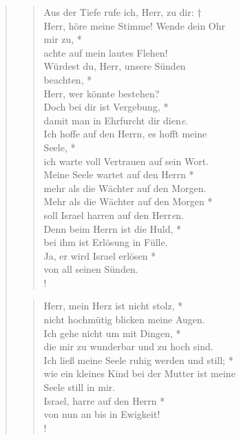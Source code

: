 \begin{quote}
\begin{verse}
Aus der Tiefe rufe ich, Herr, zu dir: †\\
Herr, höre meine Stimme! Wende dein Ohr \\mir zu, *\\ 
achte auf mein lautes Flehen! \\ \vin
Würdest du, Herr, unsere Sünden\\ \vin beachten, *\\ \vin 
Herr, wer könnte bestehen? \\
Doch bei dir ist Vergebung, *\\ 
damit man in Ehrfurcht dir dien\textit{e}.\\ \vin  
Ich hoffe auf den Herrn, es hofft meine \\ \vin Seele, *\\ \vin 
ich warte voll Vertrauen auf sein Wort.\\  
Meine Seele wartet auf den Herrn *\\ 
mehr als die Wächter auf den Morgen.\\ \vin 
 Mehr als die Wächter auf den Morgen *\\ \vin  
soll Israel harren auf den Herr\textit{e}n.\\  
Denn beim Herrn ist die Huld, *\\ 
bei ihm ist Erlösung in Fülle.\\ \vin  
Ja, er wird Israel erlösen *\\ \vin 
von all seinen Sünden.\\ !
\end{verse}



\begin{verse}


\smallskip

Herr, mein Herz ist nicht stolz, *\\ 
nicht hochmütig blicken meine Augen.\\ \vin  
Ich gehe nicht um mit Dingen, *\\ \vin  die mir zu wunderbar und zu hoch sind.\\  
Ich ließ meine Seele ruhig werden und still; *\\ 
wie ein kleines Kind bei der Mutter ist meine \\Seele still in mir.\\ \vin  
Israel, harre auf den Herrn *\\ \vin 
von nun an bis in Ewigkeit! \\!

\end{verse}
\end{quote}